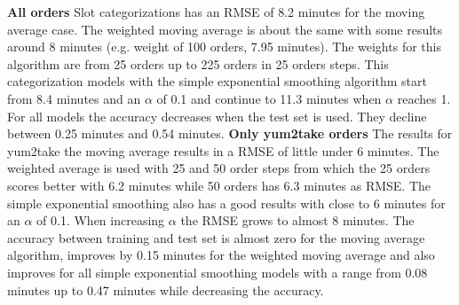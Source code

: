 \newline\newline\textbf{All orders}\newline
Slot categorizations has an RMSE of 8.2 minutes for the moving average case. The weighted moving average is about the same with some results around 8 minutes (e.g. weight of 100 orders, 7.95 minutes). The weights for this algorithm are from 25 orders up to 225 orders in 25 orders steps. This categorization models with the simple exponential smoothing algorithm start from 8.4 minutes and an $\alpha$ of 0.1 and continue to 11.3 minutes when $\alpha$ reaches 1. For all models the accuracy decreases when the test set is used. They decline between 0.25 minutes and 0.54 minutes.
\newline\newline\textbf{Only yum2take orders}\newline
The results for yum2take the moving average results in a RMSE of little under 6 minutes. The weighted average is used with 25 and 50 order steps from which the 25 orders scores better with 6.2 minutes while 50 orders has 6.3 minutes as RMSE. The simple exponential smoothing also has a good results with close to 6 minutes for an $\alpha$ of 0.1. When increasing $\alpha$ the RMSE grows to almost 8 minutes. The accuracy between training and test set is almost zero for the moving average algorithm, improves by 0.15 minutes for the weighted moving average and also improves for all simple exponential smoothing models with a range from 0.08 minutes up to 0.47 minutes while decreasing the accuracy.
